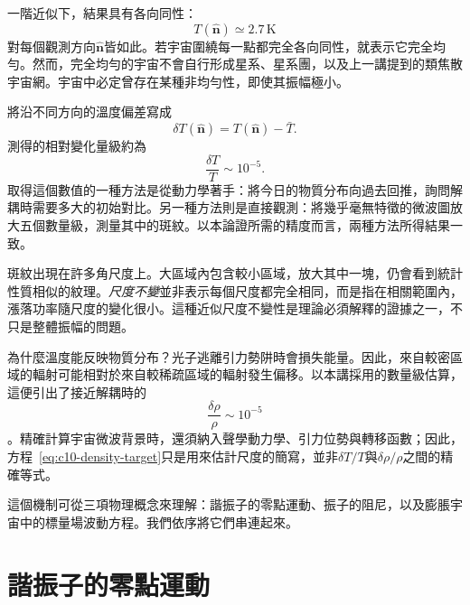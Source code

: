 一階近似下，結果具有各向同性：
\[
T(\hat{\mathbf n})\simeq 2.7\,\mathrm K
\]
對每個觀測方向\(\hat{\mathbf n}\)皆如此。若宇宙圍繞每一點都完全各向同性，就表示它完全均勻。然而，完全均勻的宇宙不會自行形成星系、星系團，以及上一講提到的類焦散宇宙網。宇宙中必定曾存在某種非均勻性，即使其振幅極小。

將沿不同方向的溫度偏差寫成
\[
\delta T(\hat{\mathbf n})=T(\hat{\mathbf n})-\bar T.
\]
測得的相對變化量級約為
\begin{equation}
\frac{\delta T}{T}\sim10^{-5}.
\label{eq:c10-cmb-anisotropy}
\end{equation}
取得這個數值的一種方法是從動力學著手：將今日的物質分布向過去回推，詢問解耦時需要多大的初始對比。另一種方法則是直接觀測：將幾乎毫無特徵的微波圖放大五個數量級，測量其中的斑紋。以本論證所需的精度而言，兩種方法所得結果一致。

斑紋出現在許多角尺度上。大區域內包含較小區域，放大其中一塊，仍會看到統計性質相似的紋理。\emph{尺度不變}並非表示每個尺度都完全相同，而是指在相關範圍內，漲落功率隨尺度的變化很小。這種近似尺度不變性是理論必須解釋的證據之一，不只是整體振幅的問題。

為什麼溫度能反映物質分布？光子逃離引力勢阱時會損失能量。因此，來自較密區域的輻射可能相對於來自較稀疏區域的輻射發生偏移。以本講採用的數量級估算，這便引出了接近解耦時的
\begin{equation}
\frac{\delta\rho}{\rho}\sim10^{-5}
\label{eq:c10-density-target}
\end{equation}
。精確計算宇宙微波背景時，還須納入聲學動力學、引力位勢與轉移函數；因此，方程~\eqref{eq:c10-density-target}只是用來估計尺度的簡寫，並非\(\delta T/T\)與\(\delta\rho/\rho\)之間的精確等式。

\begin{classroomqa}
\end{classroomqa}

這個機制可從三項物理概念來理解：諧振子的零點運動、振子的阻尼，以及膨脹宇宙中的標量場波動方程。我們依序將它們串連起來。

\section{諧振子的零點運動}

